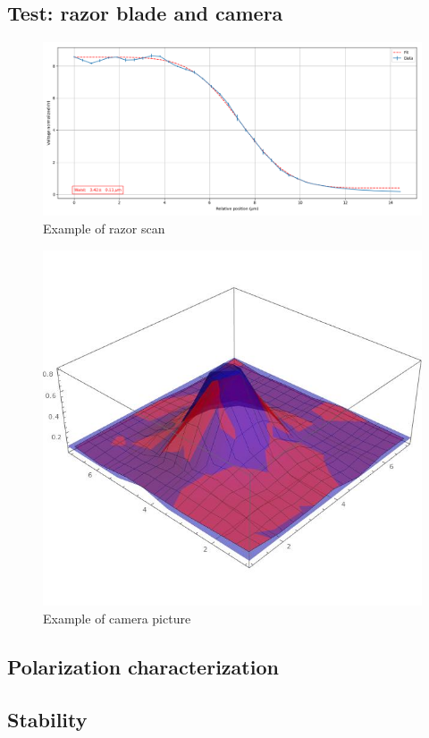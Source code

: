 \documentclass[english, a4paper, 12pt, twoside]{book}
\numberwithin{equation}{section} %
\begin{document}
\subsection{Test: razor blade and camera}
\begin{figure}[H]
\centering
\includegraphics[width=\textwidth]{img/prova7}
\caption{Example of razor scan}
\end{figure}
\begin{figure}[H]
\centering
\includegraphics[width=\textwidth]{img/camera}
\caption{Example of camera picture}
\end{figure}
\subsection{Polarization characterization}
\subsection{Stability}
\end{document}
